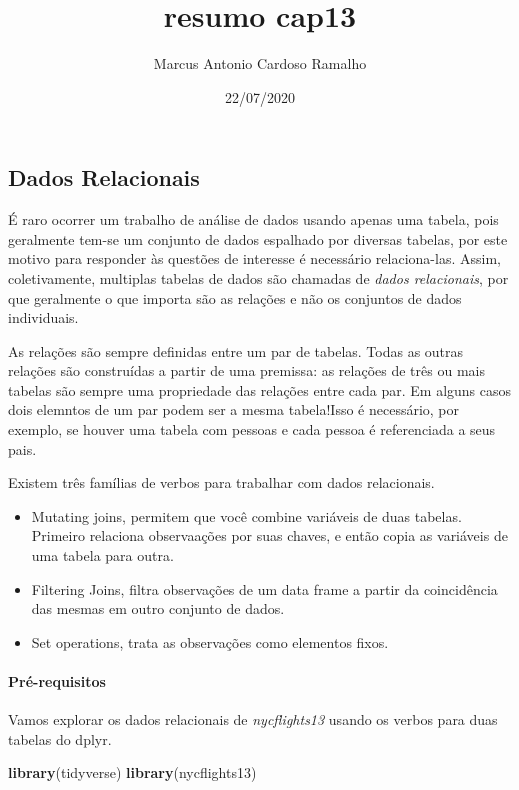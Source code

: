 \documentclass[
]{article}
\title{resumo cap13}
\author{Marcus Antonio Cardoso Ramalho}
\date{22/07/2020}
\newenvironment{Shaded}{\begin{snugshade}}{\end{snugshade}}
\newcommand{\KeywordTok}[1]{\textcolor[rgb]{0.13,0.29,0.53}{\textbf{#1}}}
\newcommand{\NormalTok}[1]{#1}
\begin{document}
\maketitle

\hypertarget{dados-relacionais}{%
\subsection{Dados Relacionais}\label{dados-relacionais}}

É raro ocorrer um trabalho de análise de dados usando apenas uma tabela,
pois geralmente tem-se um conjunto de dados espalhado por diversas
tabelas, por este motivo para responder às questões de interesse é
necessário relaciona-las. Assim, coletivamente, multiplas tabelas de
dados são chamadas de \emph{dados relacionais}, por que geralmente o que
importa são as relações e não os conjuntos de dados individuais.

As relações são sempre definidas entre um par de tabelas. Todas as
outras relações são construídas a partir de uma premissa: as relações de
três ou mais tabelas são sempre uma propriedade das relações entre cada
par. Em alguns casos dois elemntos de um par podem ser a mesma
tabela!Isso é necessário, por exemplo, se houver uma tabela com pessoas
e cada pessoa é referenciada a seus pais.

Existem três famílias de verbos para trabalhar com dados relacionais.

\begin{itemize}
\item
  Mutating joins, permitem que você combine variáveis de duas tabelas.
  Primeiro relaciona observaações por suas chaves, e então copia as
  variáveis de uma tabela para outra.
\item
  Filtering Joins, filtra observações de um data frame a partir da
  coincidência das mesmas em outro conjunto de dados.
\item
  Set operations, trata as observações como elementos fixos.
\end{itemize}

\hypertarget{pruxe9-requisitos}{%
\paragraph{Pré-requisitos}\label{pruxe9-requisitos}}

Vamos explorar os dados relacionais de \emph{nycflights13} usando os
verbos para duas tabelas do dplyr.

\begin{Shaded}
\begin{Highlighting}[]
\KeywordTok{library}\NormalTok{(tidyverse)}
\KeywordTok{library}\NormalTok{(nycflights13)}
\end{Highlighting}
\end{Shaded}
\end{document}
